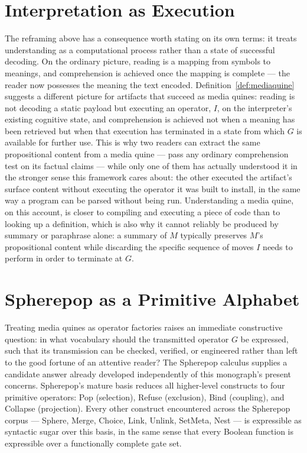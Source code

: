 \documentclass[11pt]{book}
\begin{document}
\section{Interpretation as Execution}

The reframing above has a consequence worth stating on its own terms: it treats understanding as a computational process rather than a state of successful decoding. On the ordinary picture, reading is a mapping from symbols to meanings, and comprehension is achieved once the mapping is complete --- the reader now possesses the meaning the text encoded. Definition~\ref{def:mediaquine} suggests a different picture for artifacts that succeed as media quines: reading is not decoding a static payload but executing an operator, $I$, on the interpreter's existing cognitive state, and comprehension is achieved not when a meaning has been retrieved but when that execution has terminated in a state from which $G$ is available for further use. This is why two readers can extract the same propositional content from a media quine --- pass any ordinary comprehension test on its factual claims --- while only one of them has actually understood it in the stronger sense this framework cares about: the other executed the artifact's surface content without executing the operator it was built to install, in the same way a program can be parsed without being run. Understanding a media quine, on this account, is closer to compiling and executing a piece of code than to looking up a definition, which is also why it cannot reliably be produced by summary or paraphrase alone: a summary of $M$ typically preserves $M$'s propositional content while discarding the specific sequence of moves $I$ needs to perform in order to terminate at $G$.

\section{Spherepop as a Primitive Alphabet}

Treating media quines as operator factories raises an immediate constructive question: in what vocabulary should the transmitted operator $G$ be expressed, such that its transmission can be checked, verified, or engineered rather than left to the good fortune of an attentive reader? The Spherepop calculus supplies a candidate answer already developed independently of this monograph's present concerns. Spherepop's mature basis reduces all higher-level constructs to four primitive operators: Pop (selection), Refuse (exclusion), Bind (coupling), and Collapse (projection). Every other construct encountered across the Spherepop corpus --- Sphere, Merge, Choice, Link, Unlink, SetMeta, Nest --- is expressible as syntactic sugar over this basis, in the same sense that every Boolean function is expressible over a functionally complete gate set.
\end{document}
